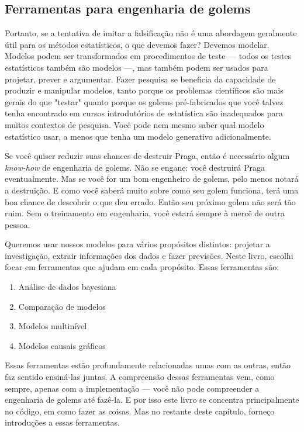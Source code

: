 \subsection{Ferramentas para engenharia de golems}

Portanto, se a tentativa de imitar a falsificação não é uma abordagem geralmente útil para os métodos estatísticos, o que devemos fazer? Devemos modelar. Modelos podem ser transformados em procedimentos de teste — todos os testes estatísticos também são modelos —, mas também podem ser usados para projetar, prever e argumentar. Fazer pesquisa se beneficia da capacidade de produzir e manipular modelos, tanto porque os problemas científicos são mais gerais do que "testar" quanto porque os golems pré-fabricados que você talvez tenha encontrado em cursos introdutórios de estatística são inadequados para muitos contextos de pesquisa. Você pode nem mesmo saber qual modelo estatístico usar, a menos que tenha um modelo generativo adicionalmente.

Se você quiser reduzir suas chances de destruir Praga, então é necessário algum \textit{know-how} de engenharia de golems. Não se engane: você destruirá Praga eventualmente. Mas se você for um bom engenheiro de golems, pelo menos notará a destruição. E como você saberá muito sobre como seu golem funciona, terá uma boa chance de descobrir o que deu errado. Então seu próximo golem não será tão ruim. Sem o treinamento em engenharia, você estará sempre à mercê de outra pessoa.

Queremos usar nossos modelos para vários propósitos distintos: projetar a investigação, extrair informações dos dados e fazer previsões. Neste livro, escolhi focar em ferramentas que ajudam em cada propósito. Essas ferramentas são:

\begin{enumerate}
  \item Análise de dados bayesiana
  \item Comparação de modelos
  \item Modelos multinível
  \item Modelos causais gráficos
\end{enumerate}

Essas ferramentas estão profundamente relacionadas umas com as outras, então faz sentido ensiná-las juntas. A compreensão dessas ferramentas vem, como sempre, apenas com a implementação — você não pode compreender a engenharia de golems até fazê-la. E por isso este livro se concentra principalmente no código, em como fazer as coisas. Mas no restante deste capítulo, forneço introduções a essas ferramentas.

